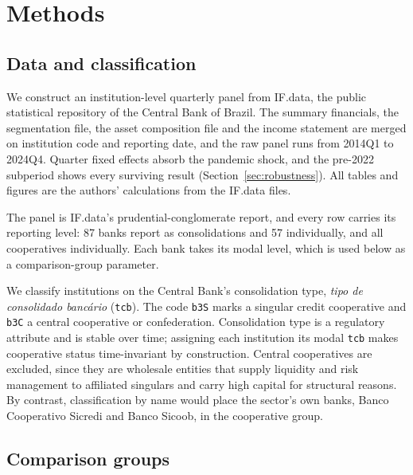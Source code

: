 \documentclass[11pt,a4paper]{article}
\begin{document}
\section{Methods}

\subsection{Data and classification}

We construct an institution-level quarterly panel from IF.data, the public statistical
repository of the Central Bank of Brazil. The summary financials, the segmentation file,
the asset composition file and the income statement are merged on institution code and
reporting date, and the raw panel runs from 2014Q1 to 2024Q4. Quarter fixed effects
absorb the pandemic shock, and the pre-2022 subperiod shows every surviving result
(Section~\ref{sec:robustness}). All tables and figures are the authors' calculations
from the IF.data files.

The panel is IF.data's prudential-conglomerate report, and every row carries its
reporting level: 87 banks report as consolidations and 57 individually, and all
cooperatives individually. Each bank takes its modal level, which is used below as a
comparison-group parameter.

We classify institutions on the Central Bank's consolidation type, \textit{tipo de
consolidado banc\'ario} (\texttt{tcb}). The code \texttt{b3S} marks a singular credit
cooperative and \texttt{b3C} a central cooperative or confederation. Consolidation type
is a regulatory attribute and is stable over time; assigning each institution its modal
\texttt{tcb} makes cooperative status time-invariant by construction. Central
cooperatives are excluded, since they are wholesale entities that supply liquidity and
risk management to affiliated singulars and carry high capital for structural reasons. By
contrast, classification by name would place the sector's own banks, Banco Cooperativo
Sicredi and Banco Sicoob, in the cooperative group.

\subsection{Comparison groups}
\label{sec:peers}
\end{document}
